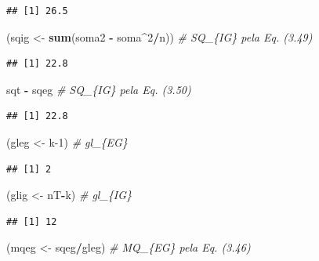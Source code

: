 \documentclass[
]{book}
\newenvironment{Shaded}{\begin{snugshade}}{\end{snugshade}}
\newcommand{\CommentTok}[1]{\textcolor[rgb]{0.56,0.35,0.01}{\textit{#1}}}
\newcommand{\DecValTok}[1]{\textcolor[rgb]{0.00,0.00,0.81}{#1}}
\newcommand{\KeywordTok}[1]{\textcolor[rgb]{0.13,0.29,0.53}{\textbf{#1}}}
\newcommand{\NormalTok}[1]{#1}
\newcommand{\OperatorTok}[1]{\textcolor[rgb]{0.81,0.36,0.00}{\textbf{#1}}}
\newcommand{\StringTok}[1]{\textcolor[rgb]{0.31,0.60,0.02}{#1}}
\theoremstyle{definition}
\theoremstyle{definition}
\theoremstyle{definition}
\theoremstyle{remark}
\begin{document}
\begin{verbatim}
## [1] 26.5
\end{verbatim}

\begin{Shaded}
\begin{Highlighting}[]
\NormalTok{(sqig \textless{}{-}}\StringTok{ }\KeywordTok{sum}\NormalTok{(soma2 }\OperatorTok{{-}}\StringTok{ }\NormalTok{soma}\OperatorTok{\^{}}\DecValTok{2}\OperatorTok{/}\NormalTok{n)) }\CommentTok{\# SQ\_\{IG\} pela Eq. (3.49)}
\end{Highlighting}
\end{Shaded}

\begin{verbatim}
## [1] 22.8
\end{verbatim}

\begin{Shaded}
\begin{Highlighting}[]
\NormalTok{sqt }\OperatorTok{{-}}\StringTok{ }\NormalTok{sqeg }\CommentTok{\# SQ\_\{IG\} pela Eq. (3.50)}
\end{Highlighting}
\end{Shaded}

\begin{verbatim}
## [1] 22.8
\end{verbatim}

\begin{Shaded}
\begin{Highlighting}[]
\NormalTok{(gleg \textless{}{-}}\StringTok{ }\NormalTok{k}\DecValTok{{-}1}\NormalTok{) }\CommentTok{\# gl\_\{EG\}}
\end{Highlighting}
\end{Shaded}

\begin{verbatim}
## [1] 2
\end{verbatim}

\begin{Shaded}
\begin{Highlighting}[]
\NormalTok{(glig \textless{}{-}}\StringTok{ }\NormalTok{nT}\OperatorTok{{-}}\NormalTok{k) }\CommentTok{\# gl\_\{IG\}}
\end{Highlighting}
\end{Shaded}

\begin{verbatim}
## [1] 12
\end{verbatim}

\begin{Shaded}
\begin{Highlighting}[]
\NormalTok{(mqeg \textless{}{-}}\StringTok{ }\NormalTok{sqeg}\OperatorTok{/}\NormalTok{gleg) }\CommentTok{\# MQ\_\{EG\} pela Eq. (3.46)}
\end{Highlighting}
\end{Shaded}
\end{document}
